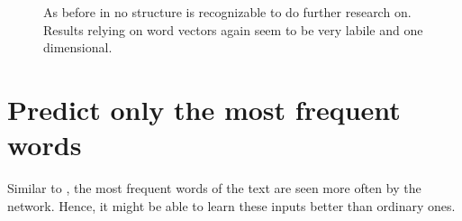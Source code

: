 \begin{figure}[t]
{	}
	\caption{As before in \figref{\ref{fig: high time steps ohe}} no structure is recognizable to do further research on. Results relying on word vectors again seem to be very labile and one dimensional.}
\end{figure}


\clearpage
\section{Predict only the most frequent words}
Similar to , the most frequent words of the text are seen more often by the network. Hence, it might be able to learn these inputs better than ordinary ones.
\begin{figure}[H]
	\centering
	\hfill
\end{figure}
